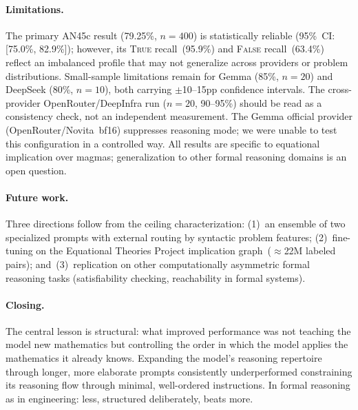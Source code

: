 \documentclass[11pt]{article}
\begin{document}
\paragraph{Limitations.}
The primary AN45c result (79.25\%, $n=400$) is statistically reliable
(95\%~CI: [75.0\%, 82.9\%]); however, its \textsc{True} recall~(95.9\%)
and \textsc{False} recall~(63.4\%) reflect an imbalanced profile that
may not generalize across providers or problem distributions. Small-sample
limitations remain for Gemma (85\%, $n=20$) and DeepSeek (80\%, $n=10$),
both carrying $\pm$10--15pp confidence intervals. The cross-provider
OpenRouter/DeepInfra run ($n=20$, 90--95\%) should be read as a
consistency check, not an independent measurement. The Gemma official
provider (OpenRouter/Novita~bf16) suppresses reasoning mode; we were
unable to test this configuration in a controlled way. All results are
specific to equational implication over magmas; generalization to other
formal reasoning domains is an open question.

\paragraph{Future work.}
Three directions follow from the ceiling characterization: (1)~an
ensemble of two specialized prompts with external routing by syntactic
problem features; (2)~fine-tuning on the Equational Theories Project
implication graph~($\approx$22M labeled pairs); and~(3)~replication
on other computationally asymmetric formal reasoning tasks
(satisfiability checking, reachability in formal systems).

\paragraph{Closing.}
The central lesson is structural: what improved performance was not
teaching the model new mathematics but controlling the order in which
the model applies the mathematics it already knows. Expanding the
model's reasoning repertoire through longer, more elaborate prompts
consistently underperformed constraining its reasoning flow through
minimal, well-ordered instructions. In formal reasoning as in
engineering: less, structured deliberately, beats more.



\end{document}
